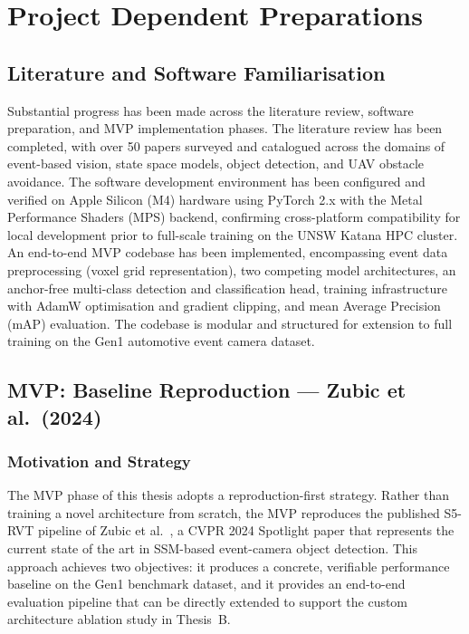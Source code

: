 \documentclass[11pt, a4paper]{report}
\begin{document}
\chapter{Project Dependent Preparations} 

\section{Literature and Software Familiarisation}
Substantial progress has been made across the literature review, software preparation, and MVP implementation phases. The literature review has been completed, with over 50 papers surveyed and catalogued across the domains of event-based vision, state space models, object detection, and UAV obstacle avoidance. The software development environment has been configured and verified on Apple Silicon (M4) hardware using PyTorch 2.x with the Metal Performance Shaders (MPS) backend, confirming cross-platform compatibility for local development prior to full-scale training on the UNSW Katana HPC cluster. An end-to-end MVP codebase has been implemented, encompassing event data preprocessing (voxel grid representation), two competing model architectures, an anchor-free multi-class detection and classification head, training infrastructure with AdamW optimisation and gradient clipping, and mean Average Precision (mAP) evaluation. The codebase is modular and structured for extension to full training on the Gen1 automotive event camera dataset. 

\section{MVP: Baseline Reproduction --- Zubic et al.\ (2024)}
\label{sec:mvp}

\subsection{Motivation and Strategy}
\label{subsec:mvp_motivation}

The MVP phase of this thesis adopts a reproduction-first strategy. Rather than training a novel architecture from scratch, the MVP reproduces the published S5-RVT pipeline of Zubic et al.\ \cite{zubic2024state}, a CVPR 2024 Spotlight paper that represents the current state of the art in SSM-based event-camera object detection. This approach achieves two objectives: it produces a concrete, verifiable performance baseline on the Gen1 benchmark dataset, and it provides an end-to-end evaluation pipeline that can be directly extended to support the custom architecture ablation study in Thesis~B.
\end{document}
